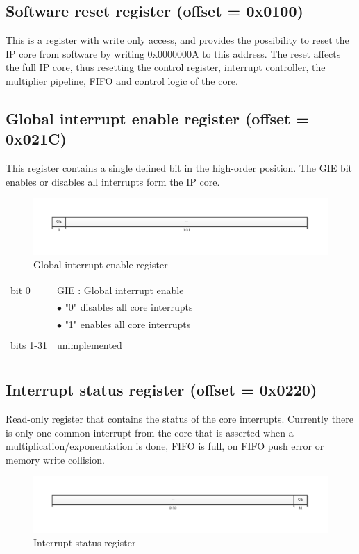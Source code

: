 \newpage
\subsection{Software reset register (offset = 0x0100)}
This is a register with write only access, and provides the possibility to reset the IP core from software by writing
0x0000000A to this address. The reset affects the full IP core, thus resetting the control register, interrupt controller,
the multiplier pipeline, FIFO and control logic of the core.

\subsection{Global interrupt enable register (offset = 0x021C)}
This register contains a single defined bit in the high-order position. The GIE bit enables or disables all interrupts
form the IP core.\\
\begin{figure}[H]
\centering
\includegraphics[trim=1.2cm 1.2cm 1.2cm 1.2cm, width=15cm]{pictures/plb_gie_reg.pdf}
\caption{Global interrupt enable register}
\end{figure}

\begin{tabular}{ll}
bit 0 		& GIE : Global interrupt enable\\
 			& $\bullet$  "0" disables all core interrupts\\
 			& $\bullet$  "1" enables all core interrupts\\
 			&\\
bits 1-31	& unimplemented\\
			&\\
\end{tabular}

\subsection{Interrupt status register (offset = 0x0220)}
Read-only register that contains the status of the core interrupts. Currently there is only one common interrupt from
the core that is asserted when a multiplication/exponentiation is done, FIFO is full, on FIFO push error or memory write
collision.\\
\begin{figure}[H]
\centering
\includegraphics[trim=1.2cm 1.2cm 1.2cm 1.2cm, width=15cm]{pictures/plb_is_reg.pdf}
\caption{Interrupt status register}
\end{figure}

